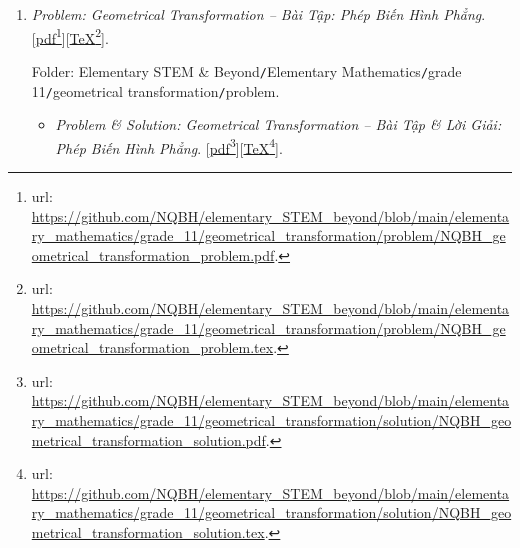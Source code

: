 \documentclass[12pt,twoside]{book}
\begin{document}
\begin{enumerate}
	Folder: {\sf Elementary STEM \& Beyond{\tt/}Elementary Mathematics{\tt/}grade 11{\tt/}orthogonality{\tt/}problem}.
	\begin{itemize}
		\item {\it Problem \& Solution: Perpendicular Relation in 3D Space. Orthographic Projection -- Bài Tập \& Lời Giải: Quan Hệ Vuông Góc Trong Không Gian 3D. Phép Chiếu Vuông Góc}. [\href{https://github.com/NQBH/elementary_STEM_beyond/blob/main/elementary_mathematics/grade_11/orthogonality/solution/NQBH_orthogonality_solution.pdf}{pdf}\footnote{{\sc url}: \url{https://github.com/NQBH/elementary_STEM_beyond/blob/main/elementary_mathematics/grade_11/orthogonality/solution/NQBH_orthogonality_solution.pdf}.}][\href{https://github.com/NQBH/elementary_STEM_beyond/blob/main/elementary_mathematics/grade_11/orthogonality/solution/NQBH_orthogonality_solution.tex}{\TeX}\footnote{{\sc url}: \url{https://github.com/NQBH/elementary_STEM_beyond/blob/main/elementary_mathematics/grade_11/orthogonality/solution/NQBH_orthogonality_solution.tex}.}].
		
		Folder: {\sf Elementary STEM \& Beyond{\tt/}Elementary Mathematics{\tt/}grade 11{\tt/}orthogonality{\tt/}solution}.
	\end{itemize}
	\item {\it Problem: Geometrical Transformation -- Bài Tập: Phép Biến Hình Phẳng}. [\href{https://github.com/NQBH/elementary_STEM_beyond/blob/main/elementary_mathematics/grade_11/geometrical_transformation/problem/NQBH_geometrical_transformation_problem.pdf}{pdf}\footnote{{\sc url}: \url{https://github.com/NQBH/elementary_STEM_beyond/blob/main/elementary_mathematics/grade_11/geometrical_transformation/problem/NQBH_geometrical_transformation_problem.pdf}.}][\href{https://github.com/NQBH/elementary_STEM_beyond/blob/main/elementary_mathematics/grade_11/geometrical_transformation/problem/NQBH_geometrical_transformation_problem.tex}{\TeX}\footnote{{\sc url}: \url{https://github.com/NQBH/elementary_STEM_beyond/blob/main/elementary_mathematics/grade_11/geometrical_transformation/problem/NQBH_geometrical_transformation_problem.tex}.}].
	
	Folder: {\sf Elementary STEM \& Beyond{\tt/}Elementary Mathematics{\tt/}grade 11{\tt/}geometrical transformation{\tt/}problem}.
	\begin{itemize}
		\item {\it Problem \& Solution: Geometrical Transformation -- Bài Tập \& Lời Giải: Phép Biến Hình Phẳng}. [\href{https://github.com/NQBH/elementary_STEM_beyond/blob/main/elementary_mathematics/grade_11/geometrical_transformation/solution/NQBH_geometrical_transformation_solution.pdf}{pdf}\footnote{{\sc url}: \url{https://github.com/NQBH/elementary_STEM_beyond/blob/main/elementary_mathematics/grade_11/geometrical_transformation/solution/NQBH_geometrical_transformation_solution.pdf}.}][\href{https://github.com/NQBH/elementary_STEM_beyond/blob/main/elementary_mathematics/grade_11/geometrical_transformation/solution/NQBH_geometrical_transformation_solution.tex}{\TeX}\footnote{{\sc url}: \url{https://github.com/NQBH/elementary_STEM_beyond/blob/main/elementary_mathematics/grade_11/geometrical_transformation/solution/NQBH_geometrical_transformation_solution.tex}.}].
		

\end{itemize}
\end{enumerate}
\end{document}

